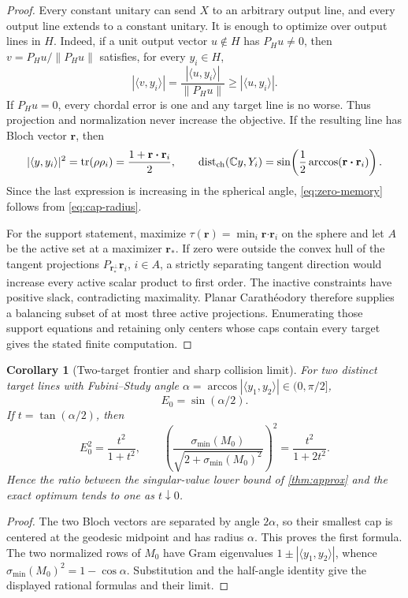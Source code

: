 \documentclass[11pt]{article}
\newtheorem{corollary}[theorem]{Corollary}
\theoremstyle{definition}\newtheorem{definition}[theorem]{Definition}\newtheorem{example}[theorem]{Example}
\theoremstyle{remark}\newtheorem{remark}[theorem]{Remark}\newtheorem{limitation}[theorem]{Limitation}
\newcommand{\C}{\mathbb C}\newcommand{\D}{\mathbb D}\newcommand{\T}{\mathbb T}
\newcommand{\norm}[1]{\lVert#1\rVert}\newcommand{\dd}{\,\mathrm d}
\begin{document}
\begin{proof}
Every constant unitary can send $X$ to an arbitrary output line, and every
output line extends to a constant unitary.  It is enough to optimize over
output lines in $H$.  Indeed, if a unit output vector $u\notin H$ has
$P_Hu\ne0$, then $v=P_Hu/\norm{P_Hu}$ satisfies, for every $y_i\in H$,
\[
 |\langle v,y_i\rangle|
 =\frac{|\langle u,y_i\rangle|}{\norm{P_Hu}}
 \ge |\langle u,y_i\rangle|.
\]
If $P_Hu=0$, every chordal error is one and any target line is no worse.
Thus projection and normalization never increase the objective.  If the
resulting line has Bloch vector $\mathbf r$, then
\[
 |\langle y,y_i\rangle|^2=\operatorname{tr}(\rho\rho_i)
   =\frac{1+\mathbf r\boldsymbol\cdot\mathbf r_i}{2},
 \qquad
 \operatorname{dist}_{\rm ch}(\C y,Y_i)
   =\sin\!\left(\frac12\arccos(\mathbf r\boldsymbol\cdot\mathbf r_i)\right).
\]
Since the last expression is increasing in the spherical angle,
\eqref{eq:zero-memory} follows from \eqref{eq:cap-radius}.

For the support statement, maximize
$\tau(\mathbf r)=\min_i\mathbf r\boldsymbol\cdot\mathbf r_i$ on the sphere and
let $A$ be the active set at a maximizer $\mathbf r_*$.  If zero were outside
the convex hull of the tangent projections
$P_{\mathbf r_*^\perp}\mathbf r_i$, $i\in A$, a strictly separating tangent
direction would increase every active scalar product to first order.  The
inactive constraints have positive slack, contradicting maximality.  Planar
Carath\'eodory therefore supplies a balancing subset of at most three active
projections.  Enumerating those support equations and retaining only centers
whose caps contain every target gives the stated finite computation.
\end{proof}

\begin{corollary}[Two-target frontier and sharp collision limit]\label{cor:two-target-error}
For two distinct target lines with Fubini--Study angle
$\alpha=\arccos|\langle y_1,y_2\rangle|\in(0,\pi/2]$,
\[
                           E_0=\sin(\alpha/2).
\]
If $t=\tan(\alpha/2)$, then
\[
 E_0^2=\frac{t^2}{1+t^2},\qquad
 \left(\frac{\sigma_{\min}(M_0)}
 {\sqrt{2+\sigma_{\min}(M_0)^2}}\right)^2
 =\frac{t^2}{1+2t^2}.
\]
Hence the ratio between the singular-value lower bound of
\cref{thm:approx} and the exact optimum tends to one as $t\downarrow0$.
\end{corollary}

\begin{proof}
The two Bloch vectors are separated by angle $2\alpha$, so their smallest cap
is centered at the geodesic midpoint and has radius $\alpha$.  This proves the
first formula.  The two normalized rows of $M_0$ have Gram eigenvalues
$1\pm|\langle y_1,y_2\rangle|$, whence
$\sigma_{\min}(M_0)^2=1-\cos\alpha$.  Substitution and the half-angle identity
give the displayed rational formulas and their limit.
\end{proof}
\end{document}
